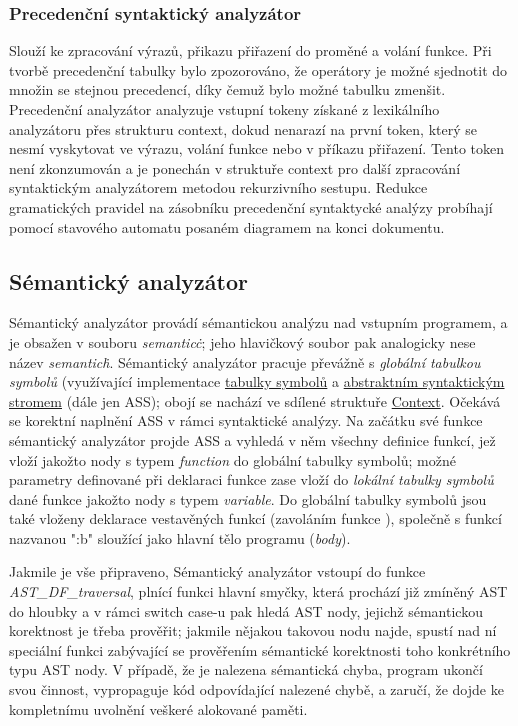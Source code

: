 \documentclass[a4paper, 11pt]{article}
\begin{document}
	\subsubsection{Precedenční syntaktický analyzátor}
	Slouží ke zpracování výrazů, přikazu přiřazení do proměné a volání funkce. Při tvorbě precedenční tabulky bylo zpozorováno, že operátory je možné sjednotit 
	do množin se stejnou precedencí, díky čemuž bylo možné tabulku zmenšit. Precedenční analyzátor analyzuje vstupní tokeny získané z lexikálního analyzátoru 
	přes strukturu context, dokud nenarazí na první token, který se nesmí vyskytovat ve výrazu, volání funkce nebo v příkazu přiřazení. Tento token není 
	zkonzumován a je ponechán v struktuře context pro další zpracování syntaktickým analyzátorem metodou rekurzivního sestupu. Redukce gramatických
	pravidel na zásobníku precedenční syntaktycké analýzy probíhají pomocí stavového automatu posaném diagramem na konci 
	dokumentu.

	\subsection{Sémantický analyzátor}
	\label{semantic}
	Sémantický analyzátor provádí sémantickou analýzu nad vstupním programem, a je obsažen v souboru \textit{semantic\.c}; jeho hlavičkový soubor pak 
	analogicky nese název \textit{semantic\.h}. Sémantický analyzátor pracuje převážně s \textit{globální tabulkou symbolů} (využívající implementace 
	\hyperref[symtab]{tabulky symbolů} a \hyperref[abstrtree]{abstraktním syntaktickým stromem} (dále jen ASS); obojí se nachází ve sdílené struktuře 
	\hyperref[cont]{Context}. Očekává se korektní naplnění ASS v rámci 
	syntaktické analýzy. Na začátku své funkce sémantický analyzátor projde ASS a vyhledá v něm všechny definice funkcí, jež vloží jakožto nody s typem 	
	\textit{function} do globální tabulky symbolů; možné parametry definované při deklaraci funkce zase vloží do \textit{lokální tabulky symbolů} dané funkce 
	jakožto nody s typem \textit{variable}. Do globální tabulky symbolů jsou také vloženy deklarace vestavěných funkcí (zavoláním funkce ), společně s funkcí 
	nazvanou ":b" sloužící jako hlavní tělo programu (\textit{body}).

	Jakmile je vše připraveno, Sémantický analyzátor vstoupí do funkce \textit{AST\_DF\_traversal}, plnící funkci hlavní smyčky, která prochází již zmíněný AST 
	do hloubky a v rámci switch case-u pak hledá AST nody, jejichž sémantickou korektnost je třeba prověřit; jakmile nějakou takovou nodu najde, spustí nad ní 
	speciální funkci zabývající se prověřením sémantické korektnosti toho konkrétního typu AST nody. V případě, že je nalezena sémantická chyba, program 
	ukončí svou činnost, vypropaguje kód odpovídající nalezené chybě, a zaručí, že dojde ke kompletnímu uvolnění veškeré alokované paměti.
\end{document}
